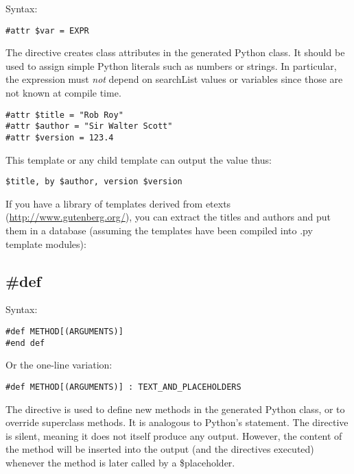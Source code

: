 Syntax:
\begin{verbatim}
#attr $var = EXPR
\end{verbatim}

The  directive creates class attributes in the generated Python
class.  It should be used to assign simple Python literals such as numbers or
strings.  In particular, the expression must {\em not} depend on searchList
values or  variables since those are not known at compile time.

\begin{verbatim}
#attr $title = "Rob Roy"
#attr $author = "Sir Walter Scott"
#attr $version = 123.4
\end{verbatim}

This template or any child template can output the value thus:
\begin{verbatim}
$title, by $author, version $version
\end{verbatim}

If you have a library of templates derived from etexts
(\url{http://www.gutenberg.org/}), you can extract the titles and authors
and put them in a database (assuming the templates have been compiled into
.py template modules):

%
%

\subsection{\#def}
\label{inheritanceEtc.def}

Syntax:
\begin{verbatim}
#def METHOD[(ARGUMENTS)]
#end def
\end{verbatim}

Or the one-line variation:
\begin{verbatim}
#def METHOD[(ARGUMENTS)] : TEXT_AND_PLACEHOLDERS
\end{verbatim}


The  directive is used to define new methods in the generated
Python class, or to override superclass methods.  It is analogous to Python's
 statement.  The directive is silent, meaning it does not itself
produce any output.  However, the content of the method will be inserted into
the output (and the directives executed) whenever the method is later called by
a \$placeholder.

